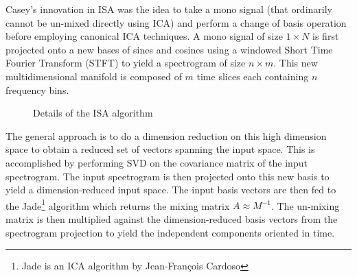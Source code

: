 Casey's innovation in ISA was the idea to take a mono signal (that
ordinarily cannot be un-mixed directly using ICA) and perform
a change of basis operation before employing canonical ICA techniques.
A mono signal of size $1 \times N$ is first projected onto a new bases of sines and
cosines using a windowed Short Time Fourier Transform (STFT) to yield
a spectrogram of size $n \times m$. This new multidimensional manifold
is composed of $m$ time slices each containing $n$ frequency bins.
\begin{figure}[thp]
  \begin{center}
    \caption{Details of the ISA algorithm}
    \label{isaflow}
  \end{center}
\end{figure}
The general approach is to do a dimension reduction on this
high dimension space to obtain a reduced set of vectors spanning the
input space. This is accomplished by performing SVD on the covariance
matrix of the input spectrogram. The input spectrogram is then
projected onto this new basis to yield a dimension-reduced input space.
The input basis vectors are then fed to the Jade\footnote{Jade is an
ICA algorithm by Jean-Fran{\c c}ois Cardoso} algorithm which returns
the mixing matrix $A \approx M^{-1}$.  The un-mixing matrix is then 
multiplied against the dimension-reduced basis vectors from the 
spectrogram projection to yield the independent components oriented in time.  

